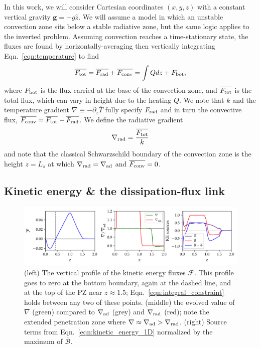 \documentclass{aastex631}
\newcommand{\gradrad}{\ensuremath{\nabla_{\rm{rad}}}}
\newcommand{\gradad}{\ensuremath{\nabla_{\rm{ad}}}}
\newcommand{\justgrad}{\ensuremath{\nabla}}
\newcommand{\Fbot}{\ensuremath{F_{\rm{bot}}}}
\newcommand{\Ftot}{\ensuremath{F_{\rm{tot}}}}
\newcommand{\Frad}{\ensuremath{F_{\rm{rad}}}}
\newcommand{\Fconv}{\ensuremath{F_{\rm{conv}}}}
\renewcommand{\vec}[1]{\boldsymbol{#1}}
\renewcommand{\bar}[1]{\overline{#1}}
\begin{document}
In this work, we will consider Cartesian coordinates $(x, y, z)$ with a constant vertical gravity $\vec{g} = -g\hat{z}$.
We will assume a model in which an unstable convection zone sits below a stable radiative zone, but the same logic applies to the inverted problem.
Assuming convection reaches a time-stationary state, the fluxes are found by horizontally-averaging then vertically integrating Eqn.~\ref{eqn:temperature} to find
\begin{equation}
\overline{\Ftot} = \overline{\Frad} + \overline{\Fconv} = \int Q dz + \Fbot,
\label{eqn:flux_definition}
\end{equation}
where $\Fbot$ is the flux carried at the base of the convection zone, and $\overline{\Ftot}$ is the total flux, which can vary in height due to the heating $Q$.
We note that $k$ and the temperature gradient $\justgrad \equiv -\partial_z \bar{T}$ fully specify $\Frad$ and in turn the convective flux, $\bar{\Fconv} = \bar{\Ftot} - \bar{\Frad}$.
We define the radiative gradient 
\begin{equation}
\gradrad = \frac{\bar{\Ftot}}{k}
\label{eqn:gradrad_definition}
\end{equation}
and note that the classical Schwarzschild boundary of the convection zone is the height $z = L_s$ at which $\gradrad = \gradad$ and $\bar{\Fconv} = 0$.

\subsection{Kinetic energy \& the dissipation-flux link}
\label{sec:theory_energy}
\begin{figure}[t!]
\centering
\includegraphics[width=\textwidth]{theory_profiles.pdf}
\caption{
(left) The vertical profile of the kinetic energy fluxes $\mathcal{F}$.
This profile goes to zero at the bottom boundary, again at the dashed line, and at the top of the PZ near $z \approx 1.5$; Eqn.~\ref{eqn:integral_constraint} holds between any two of these points.
(middle) the evolved value of $\justgrad$ (green) compared to $\gradad$ (grey) and $\gradrad$ (red); note the extended penetration zone where $\justgrad \approx \gradad > \gradrad$.
(right) Source terms from Eqn.~\ref{eqn:kinetic_energy_1D} normalized by the maximum of $\overline{\mathcal{B}}$.
\label{fig:theory_profiles}
}
\end{figure}
\end{document}
